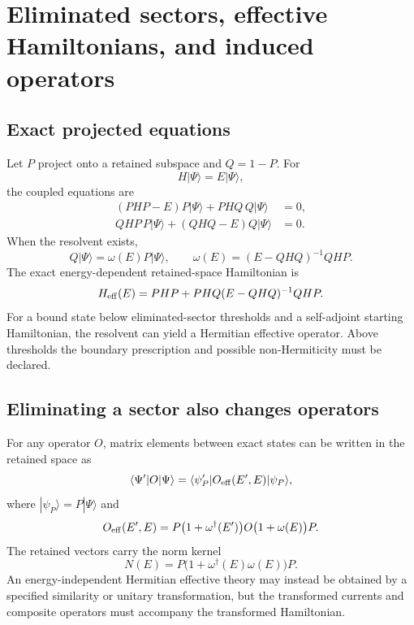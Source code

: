 \documentclass[11pt]{article}
\begin{document}
\section{Eliminated sectors, effective Hamiltonians, and induced operators}
\label{sec:feshbach}

\subsection{Exact projected equations}

Let \(P\) project onto a retained subspace and \(Q=1-P\).  For
\begin{equation}
 H|\Psi\rangle=E|\Psi\rangle,
\label{eq:generic-eigenproblem}
\end{equation}
the coupled equations are
\begin{align}
 (PHP-E)P|\Psi\rangle+PHQ\,Q|\Psi\rangle&=0,
\label{eq:p-equation}\\
 QHP\,P|\Psi\rangle+(QHQ-E)Q|\Psi\rangle&=0.
\label{eq:q-equation}
\end{align}
When the resolvent exists,
\begin{equation}
 Q|\Psi\rangle
 =\omega(E)P|\Psi\rangle,
 \qquad
 \omega(E)=(E-QHQ)^{-1}QHP.
\label{eq:wave-operator}
\end{equation}
The exact energy-dependent retained-space Hamiltonian is
\begin{equation}
 H_{\rm eff}(E)
 =PHP+PHQ(E-QHQ)^{-1}QHP.
\label{eq:feshbach-hamiltonian}
\end{equation}
For a bound state below eliminated-sector thresholds and a self-adjoint
starting Hamiltonian, the resolvent can yield a Hermitian effective operator.
Above thresholds the boundary prescription and possible non-Hermiticity must
be declared.

\subsection{Eliminating a sector also changes operators}

For any operator \(O\), matrix elements between exact states can be written
in the retained space as
\begin{equation}
 \langle\Psi'|O|\Psi\rangle
 =\langle\psi'_P|
 O_{\rm eff}(E',E)|\psi_P\rangle,
\label{eq:effective-operator-matrix}
\end{equation}
where \(|\psi_P\rangle=P|\Psi\rangle\) and
\begin{equation}
 O_{\rm eff}(E',E)
 =P\bigl(1+\omega^\dagger(E')\bigr)
 O\bigl(1+\omega(E)\bigr)P.
\label{eq:effective-operator}
\end{equation}
The retained vectors carry the norm kernel
\begin{equation}
 N(E)=P\bigl(1+\omega^\dagger(E)\omega(E)\bigr)P.
\label{eq:norm-kernel}
\end{equation}
An energy-independent Hermitian effective theory may instead be obtained by a
specified similarity or unitary transformation, but the transformed currents
and composite operators must accompany the transformed Hamiltonian.
\end{document}
